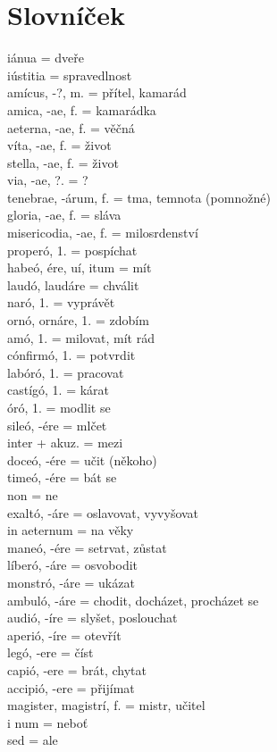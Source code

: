 \documentclass[12pt]{article}					%
\begin{document}
\section{Slovníček}
    iánua = dveře\\
    iústitia = spravedlnost\\
    amícus, -?, m. = přítel, kamarád\\
    amica, -ae, f. = kamarádka\\
    aeterna, -ae, f. = věčná\\
    víta, -ae, f. = život\\
    stella, -ae, f. = život\\
    via, -ae, ?. = ?\\
    tenebrae, -árum, f. = tma, temnota (pomnožné)\\
    gloria, -ae, f. = sláva\\
    misericodia, -ae, f. = milosrdenství\\
    properó, 1. = pospíchat\\
    habeó, ére, uí, itum = mít\\
    laudó, laudáre = chválit\\
    naró, 1. = vyprávět\\
    ornó, ornáre, 1. = zdobím\\
    amó, 1. = milovat, mít rád\\
    cónfirmó, 1. = potvrdit\\
    labóró, 1. = pracovat\\
    castígó, 1. = kárat\\
    óró, 1. = modlit se\\
    sileó, -ére = mlčet\\
    inter + akuz. = mezi\\
    doceó, -ére = učit (někoho)\\
    timeó, -ére = bát se\\
    non = ne\\
    exaltó, -áre = oslavovat, vyvyšovat\\
    in aeternum = na věky\\
    maneó, -ére = setrvat, zůstat\\
    líberó, -áre = osvobodit\\
    monstró, -áre = ukázat\\
    ambuló, -áre = chodit, docházet, procházet se\\
    audió, -íre = slyšet, poslouchat\\
    aperió, -íre = otevřít\\
    legó, -ere = číst\\
    capió, -ere = brát, chytat\\
    accipió, -ere = přijímat\\
    magister, magistrí, f. = mistr, učitel\\i
    num = neboť\\
    sed = ale\\
    

    
\end{document}

